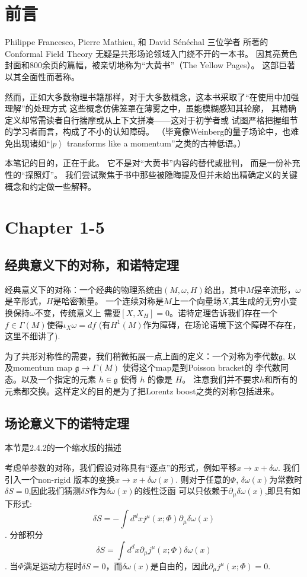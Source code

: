 \section{前言}

Philippe Francesco, Pierre Mathieu, 和 David Sénéchal 三位学者
所著的 Conformal Field Theory 无疑是共形场论领域入门绕不开的一本书。
因其亮黄色封面和800余页的篇幅，被亲切地称为“大黄书”（The Yellow Pages）。
这部巨著以其全面性而著称。

然而，正如大多数物理书籍那样，对于大多数概念，这本书采取了“在使用中加强理解”的处理方式
这些概念仿佛笼罩在薄雾之中，虽能模糊感知其轮廓，
其精确定义却常需读者自行揣摩或从上下文拼凑——这对于初学者或
试图严格把握细节的学习者而言，构成了不小的认知障碍。
（毕竟像Weinberg的量子场论中，也难免出现诸如“$\left| p \right\rangle$ transforms like a momentum”之类的古神低语。）

本笔记的目的，正在于此。 
它不是对“大黄书”内容的替代或批判，
而是一份补充性的“探照灯”。
我们尝试聚焦于书中那些被隐晦提及但并未给出精确定义的关键概念和约定做一些解释。

\section{Chapter 1-5}
\subsection{经典意义下的对称，和诺特定理}

经典意义下的对称：一个经典的物理系统由$(M,\omega,H)$给出，其中$M$是辛流形，$\omega$是辛形式，$H$是哈密顿量。
一个连续对称是$M$上一个向量场$X$,其生成的无穷小变换保持$\omega$不变，传统意义上
需要$[X,X_H]=0$。诺特定理告诉我们存在一个$f\in\Gamma(M)$使得$\iota_X\omega=df$ (有$H^1(M)$作为障碍，在场论语境下这个障碍不存在，这里不细讲了).

为了共形对称性的需要，我们稍微拓展一点上面的定义：一个对称为李代数$\mathfrak{g}$,
以及momentum map $\mathfrak{g}\rightarrow\Gamma(M)$ 使得这个map是到Poisson bracket的
李代数同态。以及一个指定的元素 $h\in \mathfrak{g}$ 使得 $h$ 的像是 $H$。
注意我们并不要求$h$和所有的元素都交换。这样定义的目的是为了把Lorentz boost之类的对称包括进来。
\subsection{场论意义下的诺特定理}
本节是2.4.2的一个缩水版的描述

考虑单参数的对称，我们假设对称具有“逐点”的形式，例如平移$x\rightarrow x+\delta\omega$.
我们引入一个non-rigid 版本的变换$x\rightarrow x+\delta\omega(x)$.
则对于任意的$\Phi$, $\delta\omega(x)$为常数时$\delta S=0$,因此我们猜测$\delta S$作为$\delta\omega(x)$的线性泛函
可以只依赖于$\partial_{\mu}\delta\omega(x)$,即具有如下形式:
$$\delta S=-\int d^d x j^\mu(x;\Phi)\partial_{\mu}\delta\omega(x)$$.
分部积分
$$\delta S=\int d^d x \partial_{\mu}j^\mu(x;\Phi)\delta\omega(x)$$.
当$\Phi$满足运动方程时$\delta S=0$，而$\delta\omega(x)$是自由的，因此$\partial_{\mu}j^\mu(x;\Phi)=0$.

